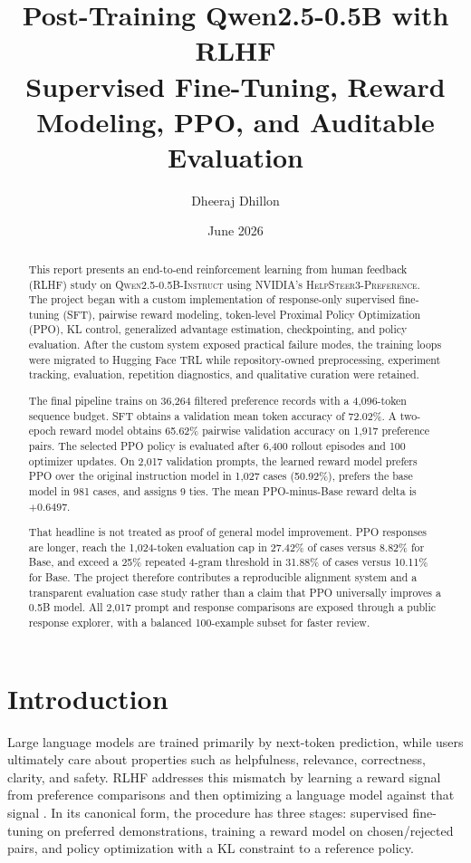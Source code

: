 \documentclass[11pt]{article}
\title{
  \vspace{-1.5cm}
  \textbf{Post-Training Qwen2.5-0.5B with RLHF}\\
  \large Supervised Fine-Tuning, Reward Modeling, PPO, and Auditable Evaluation
}
\author{Dheeraj Dhillon}
\date{June 2026}
\newcommand{\model}{\textsc{Qwen2.5-0.5B-Instruct}}
\newcommand{\dataset}{\textsc{HelpSteer3-Preference}}
\newcommand{\trl}{\textsc{TRL}}
\begin{document}
\maketitle

\begin{abstract}
This report presents an end-to-end reinforcement learning from human feedback
(RLHF) study on \model{} using NVIDIA's \dataset{}. The project began with a
custom implementation of response-only supervised fine-tuning (SFT), pairwise
reward modeling, token-level Proximal Policy Optimization (PPO), KL control,
generalized advantage estimation, checkpointing, and policy evaluation. After
the custom system exposed practical failure modes, the training loops were
migrated to Hugging Face \trl{} while repository-owned preprocessing,
experiment tracking, evaluation, repetition diagnostics, and qualitative
curation were retained.

The final pipeline trains on 36,264 filtered preference records with a
4,096-token sequence budget. SFT obtains a validation mean token accuracy of
72.02\%. A two-epoch reward model obtains 65.62\% pairwise validation accuracy
on 1,917 preference pairs. The selected PPO policy is evaluated after 6,400
rollout episodes and 100 optimizer updates. On 2,017 validation prompts, the
learned reward model prefers PPO over the original instruction model in 1,027
cases (50.92\%), prefers the base model in 981 cases, and assigns 9 ties. The
mean PPO-minus-Base reward delta is $+0.6497$.

That headline is not treated as proof of general model improvement. PPO
responses are longer, reach the 1,024-token evaluation cap in 27.42\% of cases
versus 8.82\% for Base, and exceed a 25\% repeated 4-gram threshold in 31.88\%
of cases versus 10.11\% for Base. The project therefore contributes a
reproducible alignment system and a transparent evaluation case study rather
than a claim that PPO universally improves a 0.5B model. All 2,017 prompt and
response comparisons are exposed through a public response explorer, with a
balanced 100-example subset for faster review.
\end{abstract}

\tableofcontents
\newpage

\section{Introduction}

Large language models are trained primarily by next-token prediction, while
users ultimately care about properties such as helpfulness, relevance,
correctness, clarity, and safety. RLHF addresses this mismatch by learning a
reward signal from preference comparisons and then optimizing a language model
against that signal \cite{christiano2017,stiennon2020,ouyang2022}. In its
canonical form, the procedure has three stages: supervised fine-tuning on
preferred demonstrations, training a reward model on chosen/rejected pairs,
and policy optimization with a KL constraint to a reference policy.
\end{document}

